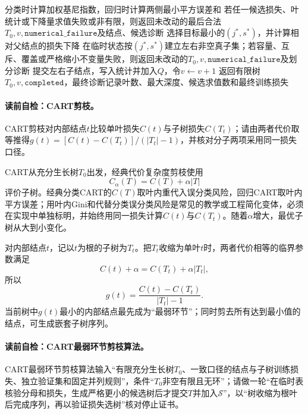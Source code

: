 \begin{AlgorithmContract}
\begin{algorithm}[H]
{  
  分类时计算加权基尼指数，回归时计算两侧最小平方误差和
  若任一候选损失、叶统计或下降量求值失败或非有限，则返回未改动的最后合法$T_0,v,\mathtt{numerical\_failure}$及结点、候选诊断\;
  选择目标最小的$(j^*,s^*)$，并计算相对父结点的损失下降
  在临时状态按$(j^*,s^*)$建立左右非空真子集；若容量、互斥、覆盖或严格缩小不变量失败，则返回未改动的$T_0,v,\mathtt{numerical\_failure}$及划分诊断\;
  提交左右子结点，写入统计并加入$Q$，令$v\leftarrow v+1$
}
返回有限树$T_0,v,\mathtt{completed}$，最终诊断记录叶数、最大深度、候选求值数和最终训练损失\;
\end{algorithm}
\end{AlgorithmContract}

\paragraph{读前自检：CART剪枝。}CART剪枝对内部结点$t$比较单叶损失$C(t)$与子树损失$C(T_t)$；请由两者代价取等推得$g(t)=[C(t)-C(T_t)]/(|T_t|-1)$，并核对分子两项采用同一损失口径。\par

CART从充分生长树$T_0$出发，经典代价复杂度剪枝使用
\[
C_\alpha(T)=C(T)+\alpha|T|
\]
评价子树。经典分类CART的$C(T)$取叶内重代入误分类风险，回归CART取叶内平方误差；用叶内Gini和代替分类误分类风险是常见的教学或工程简化变体，必须在实现中单独标明，并始终用同一损失计算$C(t)$与$C(T_t)$。随着$\alpha$增大，最优子树从大到小变化。

对内部结点$t$，记以$t$为根的子树为$T_t$。把$T_t$收缩为单叶$t$时，两者代价相等的临界参数满足
\[
C(t)+\alpha=C(T_t)+\alpha|T_t|,
\]
所以
\[
g(t)=\frac{C(t)-C(T_t)}{|T_t|-1}.
\]
当前树中$g(t)$最小的内部结点最先成为“最弱环节”；同时剪去所有达到最小值的结点，可生成嵌套子树序列。

\paragraph{读前自检：CART最弱环节剪枝算法。}CART最弱环节剪枝算法输入“有限充分生长树$T_0$、一致口径的结点与子树训练损失、独立验证集和固定并列规则”，条件“$T_0$非空有限且无环”；请做一轮“在临时表核验分母和损失，生成严格更小的候选树后才提交$T$并加入$\mathcal S$”，以“树收缩为根叶后完成序列，再以验证损失选树”核对停止证书。\par

